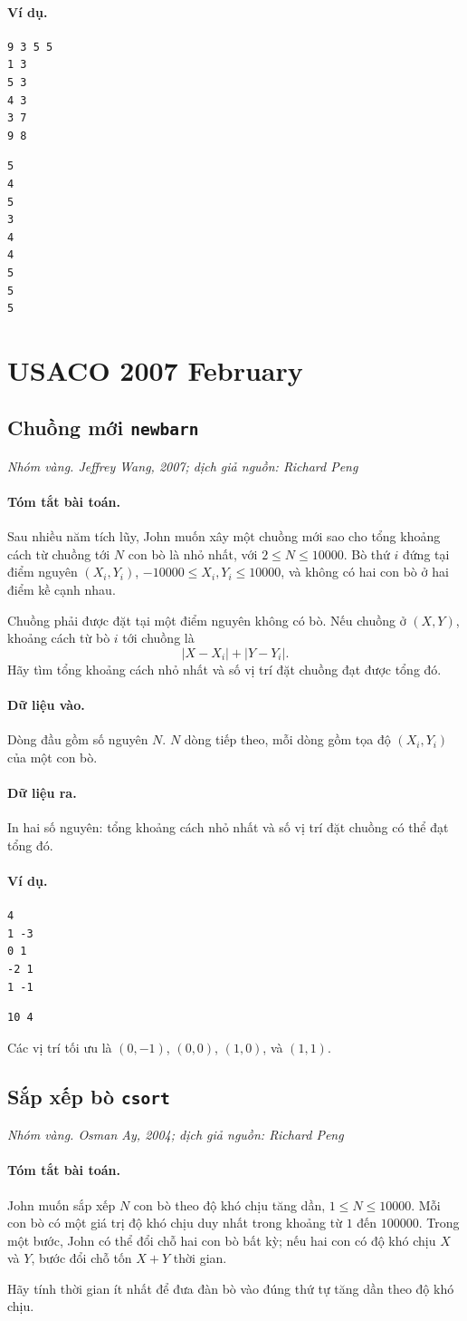 \documentclass[11pt]{article}
\newcommand{\problem}[4]{%
  \subsection[#1 (#2)]{#1 \hfill {\normalsize\texttt{#2}}}%
  \noindent\textit{#3. #4}\par\smallskip
}
\newcommand{\iosec}[1]{\paragraph{#1}}
\begin{document}
\iosec{Ví dụ.}
\begin{verbatim}
9 3 5 5
1 3
5 3
4 3
3 7
9 8
\end{verbatim}

\begin{verbatim}
5
4
5
3
4
4
5
5
5
\end{verbatim}

\section{USACO 2007 February}

\problem{Chuồng mới}{newbarn}{Nhóm vàng}{Jeffrey Wang, 2007; dịch giả nguồn: Richard Peng}

\iosec{Tóm tắt bài toán.}
Sau nhiều năm tích lũy, John muốn xây một chuồng mới sao cho tổng khoảng cách
từ chuồng tới \(N\) con bò là nhỏ nhất, với \(2\le N\le 10000\). Bò thứ \(i\)
đứng tại điểm nguyên \((X_i,Y_i)\), \(-10000\le X_i,Y_i\le 10000\), và không
có hai con bò ở hai điểm kề cạnh nhau.

Chuồng phải được đặt tại một điểm nguyên không có bò. Nếu chuồng ở
\((X,Y)\), khoảng cách từ bò \(i\) tới chuồng là
\[
  |X-X_i|+|Y-Y_i|.
\]
Hãy tìm tổng khoảng cách nhỏ nhất và số vị trí đặt chuồng đạt được tổng đó.

\iosec{Dữ liệu vào.}
Dòng đầu gồm số nguyên \(N\). \(N\) dòng tiếp theo, mỗi dòng gồm tọa độ
\((X_i,Y_i)\) của một con bò.

\iosec{Dữ liệu ra.}
In hai số nguyên: tổng khoảng cách nhỏ nhất và số vị trí đặt chuồng có thể đạt
tổng đó.

\iosec{Ví dụ.}
\begin{verbatim}
4
1 -3
0 1
-2 1
1 -1
\end{verbatim}

\begin{verbatim}
10 4
\end{verbatim}

Các vị trí tối ưu là \((0,-1)\), \((0,0)\), \((1,0)\), và \((1,1)\).

\problem{Sắp xếp bò}{csort}{Nhóm vàng}{Osman Ay, 2004; dịch giả nguồn: Richard Peng}

\iosec{Tóm tắt bài toán.}
John muốn sắp xếp \(N\) con bò theo độ khó chịu tăng dần,
\(1\le N\le 10000\). Mỗi con bò có một giá trị độ khó chịu duy nhất trong
khoảng từ \(1\) đến \(100000\). Trong một bước, John có thể đổi chỗ hai con
bò bất kỳ; nếu hai con có độ khó chịu \(X\) và \(Y\), bước đổi chỗ tốn
\(X+Y\) thời gian.

Hãy tính thời gian ít nhất để đưa đàn bò vào đúng thứ tự tăng dần theo độ khó
chịu.
\end{document}
